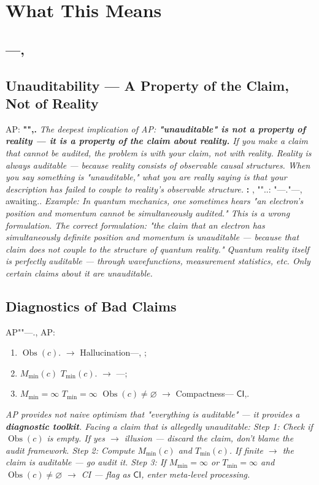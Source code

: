 \documentclass[12pt,a4paper]{article}
\theoremstyle{plain}
\theoremstyle{definition}
\theoremstyle{remark}
\newcommand{\Null}{\varnothing}
\DeclareMathOperator{\ObsSet}{Obs}
\begin{document}
\section{What This Means}
\subsection{---,}
\subsection{Unauditability --- A Property of the Claim, Not of Reality}
AP: \textbf{"",.}
\vspace{6pt}
\noindent
\textit{The deepest implication of AP: \textbf{"unauditable" is not a property of reality --- it is a property of the claim about reality.} If you make a claim that cannot be audited, the problem is with your claim, not with reality. Reality is always auditable --- because reality consists of observable causal structures. When you say something is "unauditable," what you are really saying is that your description has failed to couple to reality's observable structure.}
\vspace{6pt}
\textbf{: }, ""..: "\emph{}---."---, awaiting.\textit{}.
\vspace{4pt}
\noindent
\textit{Example: In quantum mechanics, one sometimes hears "an electron's position and momentum cannot be simultaneously audited." This is a wrong formulation. The correct formulation: "the \emph{claim} that an electron has simultaneously definite position and momentum is unauditable --- because that claim does not couple to the structure of quantum reality." Quantum reality itself is perfectly auditable --- through wavefunctions, measurement statistics, etc. Only certain \textit{claims} about it are unauditable.}
\subsection{}
\subsection{Diagnostics of Bad Claims}
AP""---., AP: 
\begin{enumerate}[label= \arabic*:, leftmargin=*]
 \item $\ObsSet(c)$. $\to$ Hallucination---, ; 
 \item $M_{\min}(c)$ $T_{\min}(c)$. $\to$ ---; 
 \item $M_{\min} = \infty$ $T_{\min} = \infty$ $\ObsSet(c) \neq \Null$ $\to$ Compactness--- $\mathsf{CI}$,.
\end{enumerate}
\vspace{4pt}
\noindent
\textit{AP provides not naive optimism that "everything is auditable" --- it provides a \textbf{diagnostic toolkit}. Facing a claim that is allegedly unauditable: Step 1: Check if $\ObsSet(c)$ is empty. If yes $\to$ illusion --- discard the claim, don't blame the audit framework. Step 2: Compute $M_{\min}(c)$ and $T_{\min}(c)$. If finite $\to$ the claim is auditable --- go audit it. Step 3: If $M_{\min} = \infty$ or $T_{\min} = \infty$ and $\ObsSet(c) \neq \Null$ $\to$ CI --- flag as $\mathsf{CI}$, enter meta-level processing.}
\end{document}
